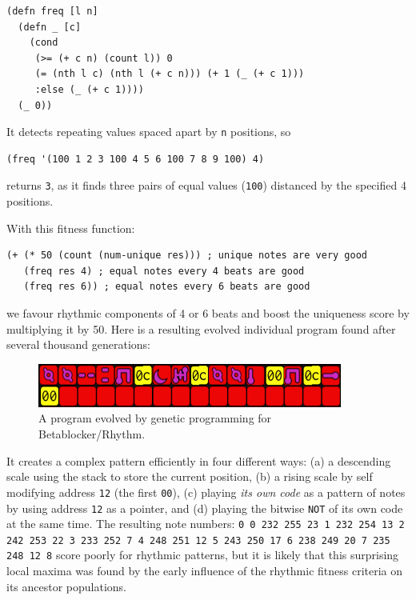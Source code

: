 \documentclass[letterpaper, 12pt]{article}
\begin{document}
\begin{Verbatim}[fontfamily=courier, xleftmargin=\parindent]
(defn freq [l n]
  (defn _ [c]
    (cond
     (>= (+ c n) (count l)) 0
     (= (nth l c) (nth l (+ c n))) (+ 1 (_ (+ c 1)))
     :else (_ (+ c 1))))
  (_ 0))
\end{Verbatim}

It detects repeating values spaced apart by \texttt{n} positions, so
\begin{Verbatim}[fontfamily=courier, xleftmargin=\parindent]
(freq '(100 1 2 3 100 4 5 6 100 7 8 9 100) 4)
\end{Verbatim}
returns \texttt{3}, as it finds three pairs of equal values (\texttt{100}) distanced by the specified 4 positions.

With this fitness function:
\begin{Verbatim}[fontfamily=courier, xleftmargin=\parindent]
(+ (* 50 (count (num-unique res))) ; unique notes are very good
   (freq res 4) ; equal notes every 4 beats are good
   (freq res 6)) ; equal notes every 6 beats are good
\end{Verbatim}
we favour rhythmic components of 4 or 6 beats and boost the uniqueness score by multiplying it by 50. Here is a resulting evolved individual program found after several thousand generations:

\begin{figure}[H]
	\centering
		\includegraphics[width=10cm]{evolved}
	\caption{A program evolved by genetic programming for Betablocker/Rhythm.}
	\label{fig:evolved}
\end{figure}

It creates a complex pattern efficiently in four different ways:
 (a) a descending scale using the stack to store the current position,
 (b) a rising scale by self modifying address \texttt{12} (the first \texttt{00}),
 (c) playing \emph{its own code} as a pattern of notes by using address \texttt{12} as a pointer, and
 (d) playing the bitwise \texttt{NOT} of its own code at the same time.
%
%
The resulting note numbers: \texttt{0 0 232 255 23 1 232 254 13 2 242 253 22 3 233 252 7 4 248 251 12 5 243 250 17 6 238 249 20 7 235 248 12 8} score poorly for rhythmic patterns, but it is likely that this surprising local maxima was found by the early influence of the rhythmic fitness criteria on its ancestor populations.
\end{document}
